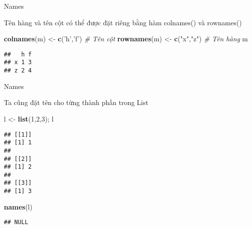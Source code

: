 \documentclass[
  ignorenonframetext,
]{beamer}
\newenvironment{Shaded}{}{}
\newcommand{\CommentTok}[1]{\textcolor[rgb]{0.38,0.63,0.69}{\textit{#1}}}
\newcommand{\DecValTok}[1]{\textcolor[rgb]{0.25,0.63,0.44}{#1}}
\newcommand{\KeywordTok}[1]{\textcolor[rgb]{0.00,0.44,0.13}{\textbf{#1}}}
\newcommand{\NormalTok}[1]{#1}
\newcommand{\StringTok}[1]{\textcolor[rgb]{0.25,0.44,0.63}{#1}}
\begin{document}
\begin{frame}[fragile]{Names}
\protect\hypertarget{names-4}{}

Tên hàng và tên cột có thể được đặt riêng bằng hàm colnames() và
rownames()

\begin{Shaded}
\begin{Highlighting}[]
\KeywordTok{colnames}\NormalTok{(m) <-}\StringTok{ }\KeywordTok{c}\NormalTok{(}\StringTok{'h'}\NormalTok{,}\StringTok{'f'}\NormalTok{)    }\CommentTok{# Tên cột}
\KeywordTok{rownames}\NormalTok{(m) <-}\StringTok{ }\KeywordTok{c}\NormalTok{(}\StringTok{"x"}\NormalTok{,}\StringTok{"z"}\NormalTok{)    }\CommentTok{# Tên hàng}
\NormalTok{m}
\end{Highlighting}
\end{Shaded}

\begin{verbatim}
##   h f
## x 1 3
## z 2 4
\end{verbatim}

\end{frame}

\begin{frame}[fragile]{Names}
\protect\hypertarget{names-5}{}

Ta cũng đặt tên cho từng thành phần trong List

\begin{Shaded}
\begin{Highlighting}[]
\NormalTok{l <-}\StringTok{ }\KeywordTok{list}\NormalTok{(}\DecValTok{1}\NormalTok{,}\DecValTok{2}\NormalTok{,}\DecValTok{3}\NormalTok{); l}
\end{Highlighting}
\end{Shaded}

\begin{verbatim}
## [[1]]
## [1] 1
## 
## [[2]]
## [1] 2
## 
## [[3]]
## [1] 3
\end{verbatim}

\begin{Shaded}
\begin{Highlighting}[]
\KeywordTok{names}\NormalTok{(l)}
\end{Highlighting}
\end{Shaded}

\begin{verbatim}
## NULL
\end{verbatim}

\end{frame}
\end{document}

